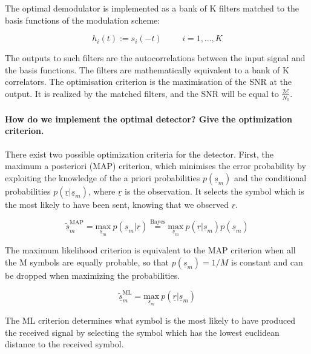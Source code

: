 The optimal demodulator is implemented 	as a bank of K filters matched to the basis functions of the modulation scheme: 

\begin{equation*}
	h_i(t) := s_i(-t) \hspace{1cm}  i=1,...,K
\end{equation*}

The outputs to such filters are the autocorrelations between the input signal and the basis functions. The filters are mathematically equivalent to a bank of K correlators. The optimisation criterion is the maximisation of the SNR at the output. It is realized by the matched filters, and the SNR will be equal to $\frac{2\mathcal{E}}{N_0}$.

\paragraph{How do we implement the optimal detector? Give the optimization criterion.} \mbox{}

There exist two possible optimization criteria for the detector. First, the maximum a posteriori (MAP) criterion, which minimises the error probability by exploiting the knowledge of the a priori probabilities $p(\underline{s}_m)$ and the conditional probabilities $p(\underline{r}|\underline{s}_m)$, where $\underline{r}$ is the observation. It selects the symbol which is the most likely to have been sent, knowing that we observed $\underline{r}$.
	
	\begin{equation*}
		\underline{\tilde{s}}^{\text{MAP}}_m = \underset{\underline{s}_m}{\text{max}} \ p(\underline{s}_m |\underline{r}) \stackrel{\text{Bayes}}{=}
		\underset{\underline{s}_m}{\text{max}} \ p(\underline{r} |\underline{s}_m) p(\underline{s}_m)
	\end{equation*}
	
The maximum likelihood criterion is equivalent to the MAP criterion when all the M symbols are equally probable, so that $p(\underline{s}_m) = 1/M$ is constant and can be dropped when maximizing the probabilities.
	
	\begin{equation*}
		\underline{\tilde{s}}^{\text{ML}}_m = \underset{\underline{s}_m}{\text{max}} \ p(\underline{r} |\underline{s}_m) 
	\end{equation*}
	
The ML criterion determines what symbol is the most likely to have produced the received signal by selecting the symbol which has the lowest euclidean distance to the received symbol.


